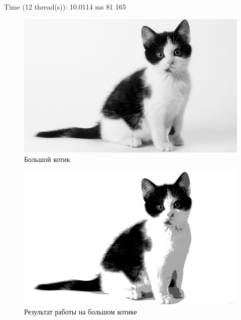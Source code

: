 \documentclass{article}
\begin{document}
	Time (12 thread(s)): 10.0114 ms \newline
	 81 165
  \begin{figure}[H]
	\includegraphics[width=1\textwidth]{pictures/in2.jpg}
	\caption{Большой котик}
  \end{figure}
  \begin{figure}[H]
	\includegraphics[width=1\textwidth]{pictures/out2.jpg}
	\caption{Результат работы на большом котике}
  \end{figure}
\end{document}
